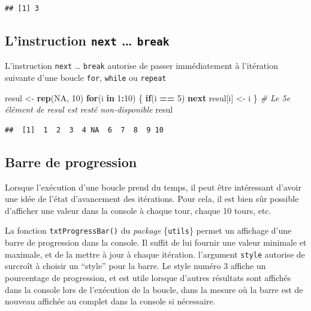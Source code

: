 \documentclass[
  11pt,
]{book}
\newenvironment{Shaded}{\begin{snugshade}}{\end{snugshade}}
\newcommand{\CommentTok}[1]{\textcolor[rgb]{0.56,0.35,0.01}{\textit{#1}}}
\newcommand{\ControlFlowTok}[1]{\textcolor[rgb]{0.13,0.29,0.53}{\textbf{#1}}}
\newcommand{\DecValTok}[1]{\textcolor[rgb]{0.00,0.00,0.81}{#1}}
\newcommand{\KeywordTok}[1]{\textcolor[rgb]{0.13,0.29,0.53}{\textbf{#1}}}
\newcommand{\NormalTok}[1]{#1}
\newcommand{\OperatorTok}[1]{\textcolor[rgb]{0.81,0.36,0.00}{\textbf{#1}}}
\newcommand{\OtherTok}[1]{\textcolor[rgb]{0.56,0.35,0.01}{#1}}
\newcommand{\StringTok}[1]{\textcolor[rgb]{0.31,0.60,0.02}{#1}}
\numberwithin{equation}{section}
\numberwithin{countremarque}{section}
\begin{document}
\begin{lstlisting}
## [1] 3
\end{lstlisting}

\hypertarget{boucles_boucles_next}{%
\subsection{\texorpdfstring{L'instruction \texttt{next} \ldots{} \texttt{break}}{L'instruction next \ldots{} break}}\label{boucles_boucles_next}}

L'instruction \texttt{next} \ldots{} \texttt{break} autorise de passer immédiatement à l'itération suivante d'une boucle \texttt{for}, \texttt{while} ou \texttt{repeat}

\begin{Shaded}
\begin{Highlighting}[]
\NormalTok{resul \textless{}{-}}\StringTok{ }\KeywordTok{rep}\NormalTok{(}\OtherTok{NA}\NormalTok{, }\DecValTok{10}\NormalTok{)}
\ControlFlowTok{for}\NormalTok{(i }\ControlFlowTok{in} \DecValTok{1}\OperatorTok{:}\DecValTok{10}\NormalTok{) \{}
  \ControlFlowTok{if}\NormalTok{(i }\OperatorTok{==}\StringTok{ }\DecValTok{5}\NormalTok{) }\ControlFlowTok{next}
\NormalTok{  resul[i] \textless{}{-}}\StringTok{ }\NormalTok{i}
\NormalTok{\}}
\CommentTok{\# Le 5e élément de resul est resté non{-}disponible}
\NormalTok{resul}
\end{Highlighting}
\end{Shaded}

\begin{lstlisting}
##  [1]  1  2  3  4 NA  6  7  8  9 10
\end{lstlisting}

\hypertarget{boucles_boucles_progressbar}{%
\subsection{Barre de progression}\label{boucles_boucles_progressbar}}

Lorsque l'exécution d'une boucle prend du temps, il peut être intéressant d'avoir une idée de l'état d'avancement des itérations. Pour cela, il est bien sûr possible d'afficher une valeur dans la console à chaque tour, chaque 10 tours, etc.

La fonction \texttt{txtProgressBar()} du \emph{package} \{\texttt{utils}\} permet un affichage d'une barre de progression dans la console. Il suffit de lui fournir une valeur minimale et maximale, et de la mettre à jour à chaque itération. l'argument \texttt{style} autorise de surcroît à choisir un ``style'' pour la barre. Le style numéro 3 affiche un pourcentage de progression, et est utile lorsque d'autres résultats sont affichés dans la console lors de l'exécution de la boucle, dans la mesure où la barre est de nouveau affichée au complet dans la console si nécessaire.
\end{document}
